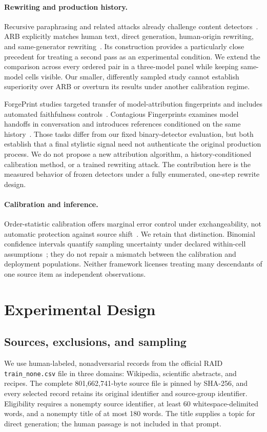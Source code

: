 \paragraph{Rewriting and production history.}
Recursive paraphrasing and related attacks already challenge content detectors~\cite{sadasivan2023}. ARB explicitly matches human text, direct generation, human-origin rewriting, and same-generator rewriting~\cite{perrone2026}. Its construction provides a particularly close precedent for treating a second pass as an experimental condition. We extend the comparison across every ordered pair in a three-model panel while keeping same-model cells visible. Our smaller, differently sampled study cannot establish superiority over ARB or overturn its results under another calibration regime.

ForgePrint studies targeted transfer of model-attribution fingerprints and includes automated faithfulness controls~\cite{yuan2026}. Contagious Fingerprints examines model handoffs in conversation and introduces references conditioned on the same history~\cite{tian2026}. Those tasks differ from our fixed binary-detector evaluation, but both establish that a final stylistic signal need not authenticate the original production process. We do not propose a new attribution algorithm, a history-conditioned calibration method, or a trained rewriting attack. The contribution here is the measured behavior of frozen detectors under a fully enumerated, one-step rewrite design.

\paragraph{Calibration and inference.}
Order-statistic calibration offers marginal error control under exchangeability, not automatic protection against source shift~\cite{angelopoulos2021}. We retain that distinction. Binomial confidence intervals quantify sampling uncertainty under declared within-cell assumptions~\cite{clopper1934}; they do not repair a mismatch between the calibration and deployment populations. Neither framework licenses treating many descendants of one source item as independent observations.

\section{Experimental Design}
\subsection{Sources, exclusions, and sampling}
We use human-labeled, nonadversarial records from the official RAID \texttt{train\_none.csv} file in three domains: Wikipedia, scientific abstracts, and recipes. The complete 801,662,741-byte source file is pinned by SHA-256, and every selected record retains its original identifier and source-group identifier. Eligibility requires a nonempty source identifier, at least 60 whitespace-delimited words, and a nonempty title of at most 180 words. The title supplies a topic for direct generation; the human passage is not included in that prompt.

